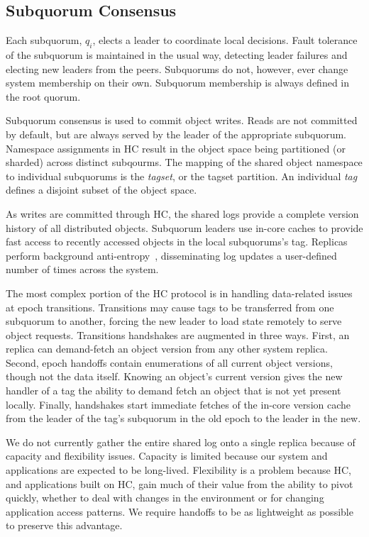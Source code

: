 \subsection{Subquorum Consensus}


Each subquorum, $q_i$, elects a leader to coordinate local decisions.
Fault tolerance of the subquorum is maintained in the usual way, detecting leader failures and electing new leaders from the peers.
Subquorums do not, however, ever change system membership on their own.
Subquorum membership is always defined in the root quorum.

Subquorum consensus is used to commit object writes.
Reads are not committed by default, but are always served by the leader of the
appropriate subquorum.
Namespace assignments in HC result in the object space being partitioned (or
sharded) across distinct subqourms.
The mapping of the shared object namespace to individual subquorums is the
\emph{tagset}, or the tagset partition.
An individual \emph{tag} defines a disjoint subset of the object space.

As writes are committed through HC, the shared logs provide a complete version history of all distributed objects.
Subquorum leaders use in-core caches to provide fast access to recently accessed objects in the local subquorums's tag.
Replicas perform background anti-entropy~\cite{dynamo,bayou,anti_entropy}, disseminating log updates a user-defined number of times across the system.

The most complex portion of the HC protocol is in handling data-related issues at epoch transitions.
Transitions may cause tags to be transferred from one subquorum to another, forcing the new leader to load state remotely to serve object requests.
Transitions handshakes are augmented in three ways.
First, an replica can demand-fetch an object version from any other system replica.
Second, epoch handoffs contain enumerations of all current object versions, though not the data itself.
Knowing an object's current version gives the new handler of a tag the ability to demand fetch an object that is not yet present locally.
Finally, handshakes start immediate fetches of the in-core version cache from the leader of the tag's subquorum in the old epoch to the leader in the new.

We do not currently gather the entire shared log onto a single replica because of capacity and flexibility issues.
Capacity is limited because our system and applications are expected to be long-lived.
Flexibility is a problem because HC, and applications built on HC, gain much of their value from the ability to pivot quickly, whether to deal with changes in the environment or for changing application access patterns.
We require handoffs to be as lightweight as possible to preserve this advantage.


